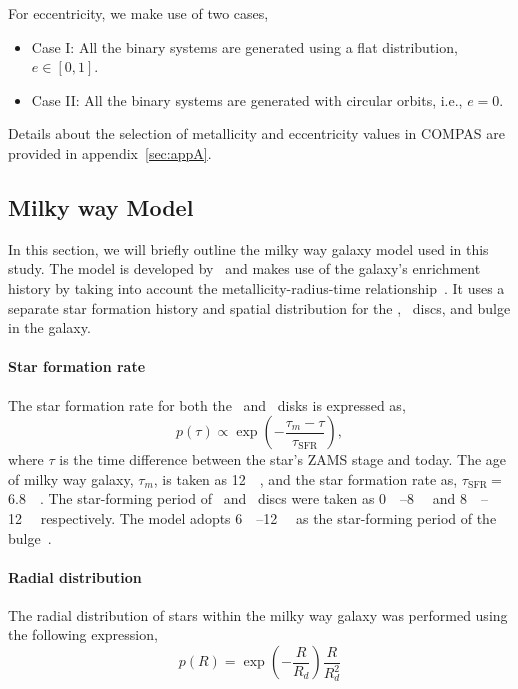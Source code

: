 For eccentricity, we make use of two cases,
\begin{itemize}
    \item Case I: All the binary systems are generated using a flat distribution, $e \in [0, 1]$.
    \item Case II: All the binary systems are generated with circular orbits, i.e., $e = 0$.
\end{itemize}

Details about the selection of metallicity and eccentricity values in COMPAS are provided in appendix~\ref{sec:appA}.

\subsection{Milky way Model}
\label{subsec:mw}
In this section, we will briefly outline the milky way galaxy model used in this study.
The model is developed by~\cite{wagg2021gravitational} and makes use of the galaxy's enrichment history by taking
into account the metallicity-radius-time relationship~\cite{Frankel2018}.
It uses a separate star formation history and spatial distribution for the \lowalpha, \highalpha\ discs, and bulge in the galaxy.

\paragraph*{\textbf{Star formation rate}}
The star formation rate for both the \lowalpha\ and \highalpha\ disks is expressed as,
\begin{equation}
    p(\tau) \propto \exp\left(-\frac{\tau_m - \tau}{\tau_\text{SFR}}\right),
    \label{eq:star_formation_rate_equation}
\end{equation}
where $\tau$ is the time difference between the star's ZAMS stage and today.
The age of milky way galaxy, $\tau_m$, is taken as \SI{12}{\giga\yr}, and the star formation rate as, $\tau_\text{
    SFR}\ $= \SI{6.8}{\giga\yr}.
The star-forming period of \lowalpha\ and \highalpha\ discs were taken as \SIrange{0}{8}{\giga\yr} and \SIrange{8}{12}{\giga\yr} respectively.
The model adopts \SIrange{6}{12}{\giga\yr} as the star-forming period of the bulge~\cite{Bovy2019}.

\paragraph*{\textbf{Radial distribution}}
The radial distribution of stars within the milky way galaxy was performed using the following expression,
\begin{equation}%
    p(R) = \exp\left(-\frac{R}{R_d}\right)\frac{R}{R_d^2}
    \label{eq:radial_distribution_of_stars}
\end{equation}%

